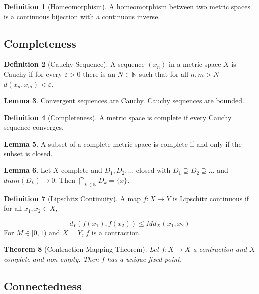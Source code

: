 \documentclass[11pt,a4paper, titlepage]{article}
\newtheorem{theorem}{Theorem}[section]
\theoremstyle{definition}
\newtheorem{definition}[theorem]{Definition}
\newtheorem{lemma}[theorem]{Lemma}
\begin{document}
\begin{definition}[Homeomorphism]
A homeomorphism between two metric spaces is a continuous bijection with a continuous inverse. 
\end{definition}

\subsection{Completeness}

\begin{definition}[Cauchy Sequence]
A sequence $(x_n)$ in a metric space $X$ is Cauchy if for every $\varepsilon > 0$ there is an $N \in \mathbb{N}$ such that for all $n,m > N$ $d(x_n, x_m) < \varepsilon$.
\end{definition}

\begin{lemma}
Convergent sequences are Cauchy. Cauchy sequences are bounded.
\end{lemma}

\begin{definition}[Completeness]
A metric space is complete if every Cauchy sequence converges.
\end{definition}

\begin{lemma}
A subset of a complete metric space is complete if and only if the subset is closed.
\end{lemma}

\begin{lemma}
Let $X$ complete and $D_1, D_2, \ldots$ closed with $D_1 \supseteq D_2 \supseteq \ldots$ and $diam(D_k) \to 0$. Then $\bigcap_{k \in \mathbb{N}} D_k = \{x\}$.
\end{lemma}

\begin{definition}[Lipschitz Continuity]
A map $f \colon X \longrightarrow Y$ is Lipschitz continuous if for all $x_1, x_2 \in X$,

\[
	d_Y(f(x_1),f(x_2)) \leqslant M d_X(x_1,x_2)
\]
For $M \in [0,1)$ and $X = Y$, $f$ is a contraction.
\end{definition}

\begin{theorem}[Contraction Mapping Theorem]
Let $f \colon X \longrightarrow X$ a contraction and $X$ complete and non-empty. Then $f$ has a unique fixed point.
\end{theorem}

\subsection{Connectedness}
\end{document}
